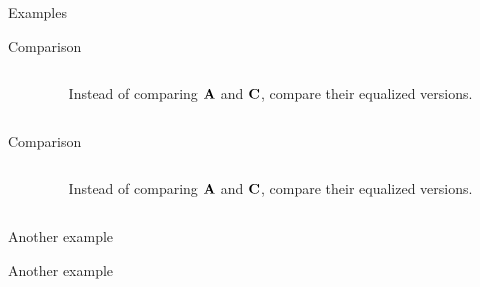 %
%
\begin{slide}{Examples}
\vspace*{-3ex}
\vspace*{-4ex}
\end{slide}


%
%
\begin{slide}{\hypertarget{compare}{Comparison}}
\begin{columns}
\begin{column}{0.7\textwidth}
\vspace*{-3ex}
\vspace*{-6ex}
\end{column}
\begin{column}{0.3\textwidth}
\scriptsize
 Instead of comparing ${\bf A}$ and ${\bf C}$, compare their
equalized versions.
\end{column}
\end{columns}
\end{slide}

%
%
\begin{slide}{Comparison}
\begin{columns}
\begin{column}{0.7\textwidth}
\vspace*{-3ex}
\vspace*{-6ex}
\end{column}
\begin{column}{0.3\textwidth}
\scriptsize
 Instead of comparing ${\bf A}$ and ${\bf C}$, compare their
equalized versions.
\end{column}
\end{columns}
\end{slide}


%
%
\begin{slide}{Another example}
\vspace{-4ex}
\end{slide}


%
%
\begin{slide}{Another example}
\vspace{-4ex}
\end{slide}





